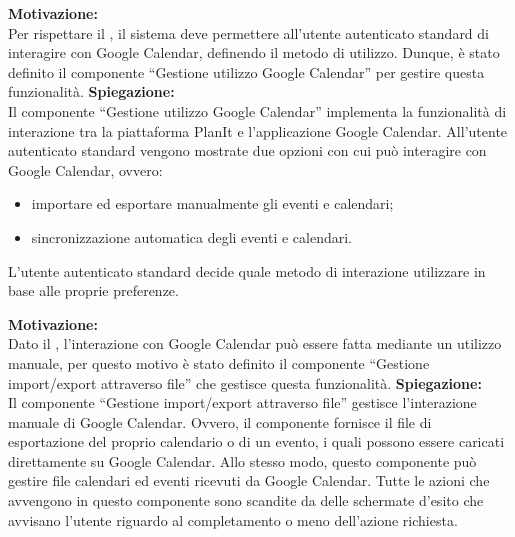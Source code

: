 \begin{listaPersonale}[ACI]{}

    \textbf{Motivazione:}\\
    Per rispettare il , il sistema deve permettere all'utente autenticato standard di interagire con Google Calendar, definendo il metodo di utilizzo. Dunque, è stato definito il componente “Gestione utilizzo Google Calendar” per gestire questa funzionalità.
    \textbf{Spiegazione:}\\
    Il componente “Gestione utilizzo Google Calendar” implementa la funzionalità di interazione tra la piattaforma PlanIt e l'applicazione Google Calendar. All'utente autenticato standard vengono mostrate due opzioni con cui può interagire con Google Calendar, ovvero:
    \begin{itemize}
        \item importare ed esportare manualmente gli eventi e calendari;
        \item sincronizzazione automatica degli eventi e calendari.
    \end{itemize}
    L'utente autenticato standard decide quale metodo di interazione utilizzare in base alle proprie preferenze.



    \textbf{Motivazione:}\\
    Dato il , l'interazione con Google Calendar può essere fatta mediante un utilizzo manuale, per questo motivo è stato definito il componente “Gestione import/export attraverso file” che gestisce questa funzionalità.
    \textbf{Spiegazione:}\\
    Il componente “Gestione import/export attraverso file” gestisce l'interazione manuale di Google Calendar. Ovvero, il componente fornisce il file di esportazione del proprio calendario o di un evento, i quali possono essere caricati direttamente su Google Calendar. Allo stesso modo, questo componente può gestire file calendari ed eventi ricevuti da Google Calendar. Tutte le azioni che avvengono in questo componente sono scandite da delle schermate d'esito che avvisano l'utente riguardo al completamento o meno dell'azione richiesta.




\end{listaPersonale}
